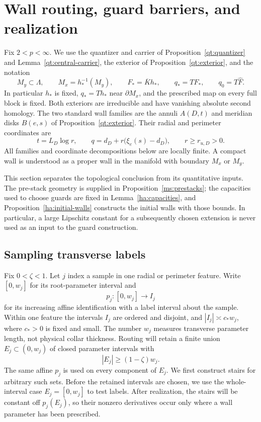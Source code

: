 \documentclass[11pt]{article}
\numberwithin{equation}{section}
\theoremstyle{definition}
\theoremstyle{remark}
\begin{document}
\section{Wall routing, guard barriers, and realization}\label{sec:walls}\label{wl:section}

Fix $2<p<\infty$.  We use the quantizer and carrier of
Proposition~\ref{qt:quantizer} and Lemma~\ref{qt:central-carrier}, the exterior
of Proposition~\ref{qt:exterior}, and the notation
\[
 M_y\subset\Lambda,\qquad M_x=h_*^{-1}(M_y),\qquad
 F_*=\overline K h_*,\qquad q_*=TF_*,\qquad q_0=T\widehat F.
\]
In particular $h_*$ is fixed, $q_*=Th_*$ near $\partial M_x$, and the
prescribed map on every full block is fixed.  Both exteriors are
irreducible and have vanishing absolute second homology.  The two
standard wall families are the annuli $A(D,t)$ and meridian disks
$B(e,s)$ of Proposition~\ref{qt:exterior}.  Their radial and perimeter
coordinates are
\[
 t=L_D\log r,\qquad
 q=d_D+r\bigl(\xi_e(s)-d_D\bigr),\qquad r\geq r_{u,D}>0.
\]
All families and coordinate decompositions below are locally finite.
A compact wall is understood as a proper wall in the manifold with
boundary $M_x$ or $M_y$.

This section separates the topological conclusion from its quantitative
inputs.  The pre-stack geometry is supplied in
Proposition~\ref{ms:prestacks}; the capacities used to choose guards are
fixed in Lemma~\ref{ha:capacities}, and
Proposition~\ref{ha:initial-walls} constructs the initial walls with
those bounds.  In particular, a large
Lipschitz constant for a subsequently chosen extension is never used as
an input to the guard construction.

\subsection{Sampling transverse labels}

Fix $0<\zeta<1$.  Let $j$ index a sample in one radial or perimeter
feature.  Write
$[0,w_j]$ for its root-parameter interval and
\[
 p_j:[0,w_j]\longrightarrow I_j
\]
for its increasing affine identification with a label interval about
the sample.  Within one feature the intervals $I_j$ are ordered and
disjoint, and $|I_j|\asymp c_*w_j$, where $c_*>0$ is fixed and small.
The number $w_j$ measures transverse parameter length, not physical
collar thickness.  Routing will retain a finite union
$E_j\subset(0,w_j)$ of closed parameter intervals with
\begin{equation}\label{wl:occupied-length}
 |E_j|\geq(1-\zeta)w_j.
\end{equation}
The same affine $p_j$ is used on every component of $E_j$.
We first construct stairs for arbitrary such sets.  Before the retained
intervals are chosen, we use the whole-interval case $E_j=[0,w_j]$
to test labels.  After realization, the stairs will be constant off
$p_j(E_j)$, so their nonzero derivatives occur only where a wall
parameter has been prescribed.
\end{document}
